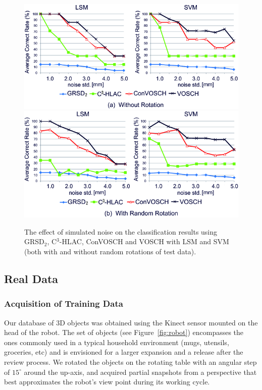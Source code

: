 \documentclass[a4paper, 10 pt, conference]{sty/ieeeconf}
\begin{document}
\begin{figure}[tb!]
  \centering
  \includegraphics[width=.49\textwidth]{figures/synthetic_experiment/synthetic_experimental_result_1.png}
  \includegraphics[width=.49\textwidth]{figures/synthetic_experiment/synthetic_experimental_result_2.png}
  \caption{The effect of simulated noise on the classification results using GRSD$_2$, C$^3$-HLAC, ConVOSCH and VOSCH with LSM and SVM
    (both with and without random rotations of test data).}
  \label{fig:synthetic}
\end{figure}


\subsection{Real Data}
\label{sec:real_data}
\subsubsection{Acquisition of Training Data}
Our database of 3D objects was obtained using the Kinect sensor mounted on the head of the robot.
The set of objects (see Figure~\ref{fig:robot}) encompasses the ones commonly used
in a typical household environment (mugs, utensils, groceries, etc) and is envisioned for a
larger expansion and a release after the review process. We rotated the objects on the rotating table with
an angular step of $15^\circ$ around the up-axis, and acquired partial
snapshots from a perspective that best approximates the robot's view point during its working cycle.  

\end{document}
